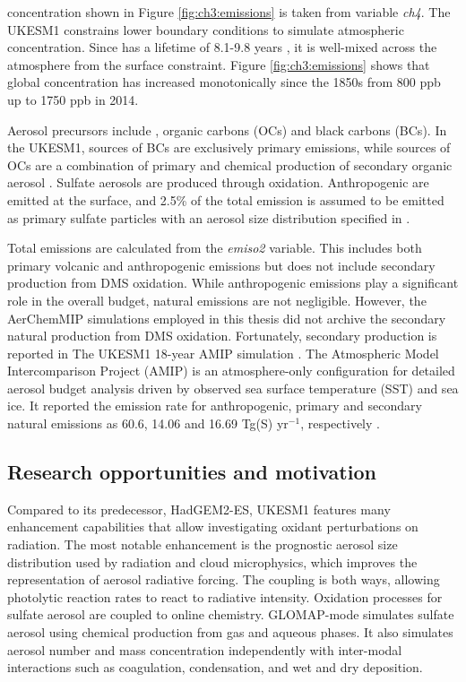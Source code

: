  concentration shown in Figure \ref{fig:ch3:emissions} is taken from variable \textit{ch4}. The UKESM1 constrains lower boundary conditions to simulate atmospheric  concentration. Since  has a lifetime of 8.1-9.8 years \citep{oconnorAssessmentPreindustrialPresentday2021}, it is well-mixed across the atmosphere from the surface constraint. Figure \ref{fig:ch3:emissions} shows that global  concentration has increased monotonically since the 1850s from 800 ppb up to 1750 ppb in 2014. 

Aerosol precursors include , organic carbons (OCs) and black carbons (BCs). In the UKESM1, sources of BCs are exclusively primary emissions, while sources of OCs are a combination of primary and chemical production of secondary organic aerosol \citep{mulcahyDescriptionEvaluationAerosol2020}. Sulfate aerosols are produced through oxidation. Anthropogenic  are emitted at the surface, and 2.5\% of the total emission is assumed to be emitted as primary sulfate particles with an aerosol size distribution specified in \citep{stierAerosolclimateModelECHAM5HAM2005}. 

Total  emissions are calculated from the \textit{emiso2} variable. This includes both primary volcanic and anthropogenic  emissions but does not include secondary production from DMS oxidation. While anthropogenic  emissions play a significant role in the overall  budget, natural emissions are not negligible. However, the AerChemMIP simulations employed in this thesis did not archive the secondary natural  production from DMS oxidation. Fortunately, secondary production is reported in The UKESM1 18-year AMIP simulation \citep{mulcahyDescriptionEvaluationAerosol2020}. The Atmospheric Model Intercomparison Project (AMIP) is an atmosphere-only configuration for detailed aerosol budget analysis driven by observed sea surface temperature (SST) and sea ice. It reported the emission rate for anthropogenic, primary and secondary natural  emissions as 60.6, 14.06 and 16.69 Tg(S) yr$^{-1}$, respectively \citep{mulcahyDescriptionEvaluationAerosol2020}. 

\subsection{Research opportunities and motivation}

Compared to its predecessor, HadGEM2-ES, UKESM1 features many enhancement capabilities that allow investigating oxidant perturbations on radiation\citep{sellarUKESM1DescriptionEvaluation2019}. The most notable enhancement is the prognostic aerosol size distribution used by radiation and cloud microphysics, which improves the representation of aerosol radiative forcing. The coupling is both ways, allowing photolytic reaction rates to react to radiative intensity. Oxidation processes for sulfate aerosol are coupled to online chemistry. GLOMAP-mode simulates sulfate aerosol using chemical production from gas and aqueous phases. It also simulates aerosol number and mass concentration independently with inter-modal interactions such as coagulation, condensation, and wet and dry deposition. 

